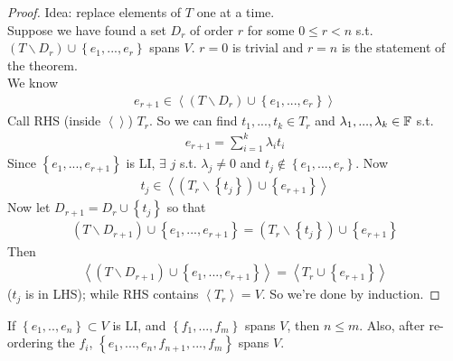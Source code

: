 \documentclass[a4paper]{article}
\begin{document}
\begin{proof}
Idea: replace elements of $T$ one at a time.\\
Suppose we have found a set $D_r$ of order $r$ for some $0 \leq r < n$ s.t. $\left(T \backslash D_r\right) \cup \left\{ e_1,...,e_r\right\}$ spans $V$. $r=0$ is trivial and $r=n$ is the statement of the theorem.\\
We know
\begin{equation*}
\begin{aligned}
e_{r+1} \in \left< \left(T \backslash D_r\right) \cup \left\{e_1,...,e_r\right\} \right>
\end{aligned}
\end{equation*}
Call RHS (inside $\left<\right>$) $T_r$. So we can find $t_1,...,t_k \in T_r$ and $\lambda_1,...,\lambda_k \in \mathbb{F}$ s.t.
\begin{equation*}
\begin{aligned}
e_{r+1} = \sum_{i=1}^k \lambda_i t_i
\end{aligned}
\end{equation*}
Since $\left\{e_1,...,e_{r+1}\right\}$ is LI, $\exists$ $j$ s.t. $\lambda_j \neq 0$ and $t_j \not \in \left\{ e_1,...,e_r\right\}$. Now 
\begin{equation*}
\begin{aligned}
t_j \in \left<\left(T_r \backslash \left\{ t_j\right\} \right) \cup \left\{e_{r+1}\right\}\right>
\end{aligned}
\end{equation*}
Now let $D_{r+1} = D_r \cup \left\{ t_j\right\}$ so that 
\begin{equation*}
\begin{aligned}
\left(T\backslash D_{r+1} \right) \cup \left\{e_1,...,e_{r+1}\right\} = \left(T_r \backslash \left\{t_j\right\}\right) \cup \left\{e_{r+1}\right\}
\end{aligned}
\end{equation*}
Then
\begin{equation*}
\begin{aligned}
\left<\left(T \backslash D_{r+1}\right) \cup \left\{e_1,...,e_{r+1}\right\}\right> = \left<T_r \cup \left\{e_{r+1}\right\} \right>
\end{aligned}
\end{equation*}
($t_j$ is in LHS); while RHS contains $\left<T_r\right>=V$. So we're done by induction.
\end{proof}

\begin{coro}
If $\left\{e_1,..,e_n\right\} \subset V$ is LI, and $\left\{f_1,...,f_m\right\}$ spans $V$, then $n \leq m$. Also, after re-ordering the $f_i$, $\left\{e_1,...,e_n,f_{n+1},...,f_{m}\right\}$ spans $V$.
\end{coro}
\end{document}
